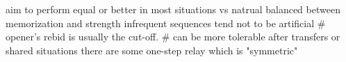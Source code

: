 aim to perform equal or better in most situations vs natrual
balanced between memorization and strength
    infrequent sequences tend not to be artificial
    # opener's rebid is usually the cut-off.
    # can be more tolerable after transfers or shared situations
there are some one-step relay which is "symmetric"
